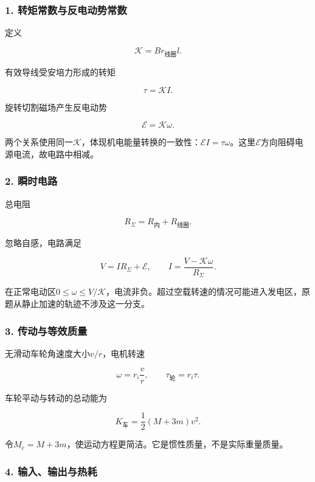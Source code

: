 \documentclass[12pt,a4paper,fontset=fandol]{ctexart}
\begin{document}
\subsubsection{1.
转矩常数与反电动势常数}\label{ux8f6cux77e9ux5e38ux6570ux4e0eux53cdux7535ux52a8ux52bfux5e38ux6570}

定义

\[
\mathcal K=B r_{\text{线圈}}l.
\]

有效导线受安培力形成的转矩

\[
\tau=\mathcal K I.
\]

旋转切割磁场产生反电动势

\[
\mathcal E=\mathcal K\omega.
\]

两个关系使用同一\(\mathcal K\)，体现机电能量转换的一致性：\(\mathcal EI=\tau\omega\)。这里\(\mathcal E\)方向阻碍电源电流，故电路中相减。

\subsubsection{2. 瞬时电路}\label{ux77acux65f6ux7535ux8def}

总电阻

\[
R_\Sigma=R_{\text{内}}+R_{\text{线圈}}.
\]

忽略自感，电路满足

\[
V=IR_\Sigma+\mathcal E,
\qquad I=\frac{V-\mathcal K\omega}{R_\Sigma}.
\]

在正常电动区\(0\leq\omega\leq V/\mathcal K\)，电流非负。超过空载转速的情况可能进入发电区，原题从静止加速的轨迹不涉及这一分支。

\subsubsection{3.
传动与等效质量}\label{ux4f20ux52a8ux4e0eux7b49ux6548ux8d28ux91cf}

无滑动车轮角速度大小\(v/r\)，电机转速

\[
\omega=r_i\frac vr,\qquad
\tau_{\text{轮}}=r_i\tau.
\]

车轮平动与转动的总动能为

\[
K_{\text{车}}=\frac12(M+3m)v^2.
\]

令\(M_e=M+3m\)，使运动方程更简洁。它是惯性质量，不是实际重量质量。

\subsubsection{4.
输入、输出与热耗}\label{ux8f93ux5165ux8f93ux51faux4e0eux70edux8017}
\end{document}
